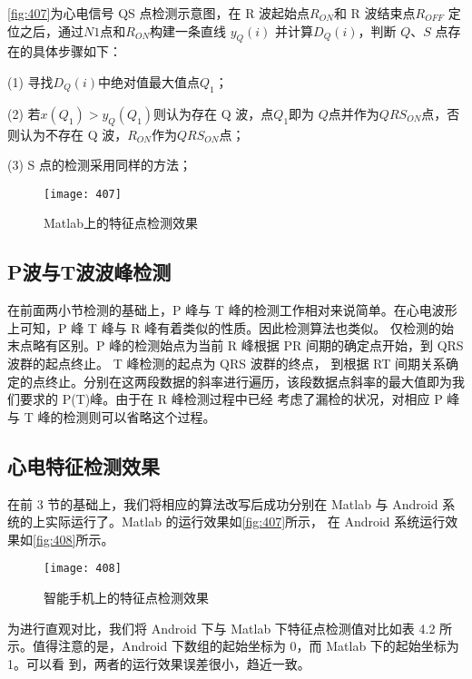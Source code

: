 \autoref{fig:407}为心电信号 QS 点检测示意图，在 R 波起始点$R_{ON}$和 R 波结束点$R_{OFF}$ 定位之后，通过$N1$点和$R_{ON}$构建一条直线 
$y_Q(i)$ 并计算$D_Q(i)$，判断 $Q$、$S$ 点存在的具体步骤如下： 

(1)	寻找$D_Q(i)$中绝对值最大值点$Q_1$； 

(2)	若$x(Q_1)>y_Q(Q_1)$则认为存在 Q 波，点$Q_1$即为 $Q $点并作为$QRS_{ON}$点，否则认为不存在 Q 波，$R_{ON}$作为$QRS_{ON}$点； 

(3)	S 点的检测采用同样的方法； 

\begin{figure}[htbp]
    \centering
    \texttt{[image: 407]}
    \caption{\label{fig:407}Matlab上的特征点检测效果}
\end{figure} 

\subsection{P波与T波波峰检测}
在前面两小节检测的基础上，P 峰与 T 峰的检测工作相对来说简单。在心电波形上可知，P 峰 T 峰与 R 峰有着类似的性质。因此检测算法也类似。
仅检测的始末点略有区别。P 峰的检测始点为当前 R 峰根据 PR 间期的确定点开始，到 QRS 波群的起点终止。 T 峰检测的起点为 QRS 波群的终点，
到根据 RT 间期关系确定的点终止。分别在这两段数据的斜率进行遍历，该段数据点斜率的最大值即为我们要求的 P(T)峰。由于在 R 峰检测过程中已经
考虑了漏检的状况，对相应 P 峰与 T 峰的检测则可以省略这个过程。 

\subsection{心电特征检测效果}
在前 3 节的基础上，我们将相应的算法改写后成功分别在 Matlab 与 Android 系统的上实际运行了。Matlab 的运行效果如\autoref{fig:407}所示，
在 Android 系统运行效果如\autoref{fig:408}所示。 

\begin{figure}[htbp]
    \centering
    \texttt{[image: 408]}
    \caption{\label{fig:408}智能手机上的特征点检测效果 }
\end{figure}

为进行直观对比，我们将 Android 下与 Matlab 下特征点检测值对比如表 4.2 所示。值得注意的是，Android 下数组的起始坐标为 0，而 Matlab 下的起始坐标为 1。可以看
到，两者的运行效果误差很小，趋近一致。 

